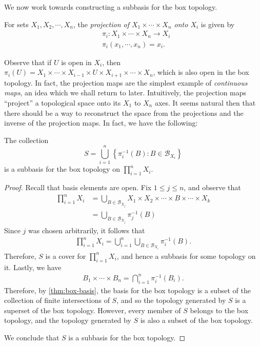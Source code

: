We now work towards constructing a subbasis for the box topology.
\begin{definition}
\label{def:projection}
For sets $X_{1},X_{2}, \cdots, X_{n}$, the \emph{projection of
$X_{1} \times \cdots \times X_{n}$ onto $X_{i}$} is given by
\begin{align*}
& \pi_{i}: X_{1} \times \cdots \times X_{n} \to X_{i} \\
& \pi_{i}(x_{1}, \cdots, x_{n}) = x_{i}.
\end{align*}
\end{definition}
Observe that if $U$ is open in $X_{i}$, then $\pi_{i}(U) = X_{1} \times \cdots
\times X_{i-1} \times U \times X_{i+1} \times \cdots \times X_{n}$, which is
also open in the box topology. In fact, the projection maps are the
simplest example of \emph{continuous maps}, an idea which we shall return to
later. Intuitively, the projection maps ``project'' a topological space onto its
$X_{1}$ to $X_{n}$ axes. It seems natural then that there should be a way to
reconstruct the space from the projections and the inverse of the projection
maps. In fact, we have the following:
\begin{theorem}
\label{thm:proj-subbasis}
The collection
\begin{equation*}
S = \bigcup_{i=1}^{n} \left\{ \pi_{i}^{-1}(B): B \in \mathcal{B}_{X_{i}} \right\}
\end{equation*}
is a subbasis for the box topology on $\prod_{i=1}^{n} X_{i}$.
\end{theorem}
\begin{proof}
Recall that basis elements are open. Fix $1 \le j \le n$, and observe that
\begin{align*}
\prod_{i=1}^{n} X_{i}
&= \bigcup_{B \in
\mathcal{B}_{X_{j}}}X_{1} \times X_{2} \times \cdots \times B \times
\cdots \times X_{k} \\
&= \bigcup_{B \in \mathcal{B}_{X_{j}}} \pi_{j}^{-1}(B)
\end{align*}
Since $j$ was chosen arbitrarily, it follows that
\begin{align*}
\prod_{i=1}^{n} X_{i} = \bigcup_{i=1}^{n} \bigcup_{B \in
\mathcal{B}_{X_{i}}} \pi_{i}^{-1}(B).
\end{align*}
Therefore, $S$ is a cover for $\prod_{i=1}^{n} X_{i}$, and hence a subbasis
for some topology on it.
Lastly, we have
\begin{align*}
B_{1} \times \cdots \times B_{n} = \bigcap_{i=1}^{n} \pi_{i}^{-1}(B_{i}).
\end{align*}
Therefore, by \cref{thm:box-basis}, the basis for the box topology is
a subset of the collection of finite intersections of $S$, and so the topology
generated by $S$ is a superset of the box topology. However, every member
of $S$ belongs to the box topology, and the topology generated by $S$ is
also a subset of the box topology.

We conclude that $S$ is a subbasis for the box topology.
\end{proof}
